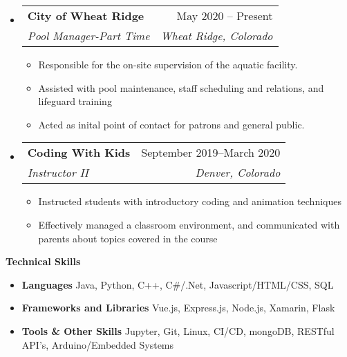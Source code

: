 \documentclass[letterpaper,12pt]{article}[leftmargin=*]
\makeatletter
\def \entryspacing {-0pt}
\renewcommand{\section}[2]{\vspace{5pt}
  \colorbox{secondary}{\color{white}\raggedbottom\normalsize\textbf{{#1}{\hspace{7pt}#2}}}
}
\newcommand{\resumeEntryStart}{\begin{itemize}[leftmargin=2.5mm]}
\newcommand{\resumeEntryEnd}{\end{itemize}\vspace{\entryspacing}}
\newcommand{\resumeItemListStart}{\begin{itemize}[leftmargin=4.5mm]}
\newcommand{\resumeItemListEnd}{\end{itemize}}
\newcommand{\resumeItem}[1]{
  \item\small{
    {#1 \vspace{-2pt}}
  }
}
\newcommand{\resumeEntryTSDL}[4]{
  \vspace{-1pt}\item[]
    \begin{tabularx}{0.97\textwidth}{X@{\hspace{60pt}}r}
      \textbf{\color{primary}#1} & {\firabook\color{accent}\small#2} \\
      \textit{\color{accent}\small#3} & \textit{\color{accent}\small#4} \\
    \end{tabularx}\vspace{-6pt}
}
\newcommand{\resumeEntryS}[2]{
  \item[]\small{
    \textbf{\color{primary}#1 }{ #2 \vspace{-6pt}}
  }
}
\makeatother
\begin{document}
  \resumeEntryStart
    \resumeEntryTSDL
      {City of Wheat Ridge}{May 2020 -- Present}
      {Pool Manager-Part Time}{Wheat Ridge, Colorado}
    \resumeItemListStart
      \resumeItem {Responsible for the on-site supervision of the aquatic facility.}
      \resumeItem {Assisted with pool maintenance, staff scheduling and relations, and lifeguard training}
      \resumeItem {Acted as inital point of contact for patrons and general public.}
    \resumeItemListEnd
  \resumeEntryEnd

  \resumeEntryStart
    \resumeEntryTSDL
      {Coding With Kids}{September 2019--March 2020}
      {Instructor II}{Denver, Colorado}
    \resumeItemListStart
      \resumeItem {Instructed students with introductory coding and animation techniques}
      \resumeItem {Effectively managed a classroom environment, and communicated with parents about topics covered in the course} 
    \resumeItemListEnd
  \resumeEntryEnd






\section{\faGears}{Technical Skills}
 \resumeEntryStart
  \resumeEntryS{Languages } {Java, Python, C++, C\#/.Net, Javascript/HTML/CSS, SQL}
  \resumeEntryS{Frameworks and Libraries } {Vue.js, Express.js, Node.js, Xamarin, Flask}
  \resumeEntryS{Tools \& Other Skills }{ Jupyter, Git, Linux, CI/CD, mongoDB, RESTful API's, Arduino/Embedded Systems}
 \resumeEntryEnd
\end{document}
